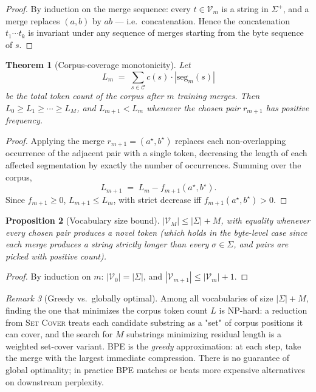\documentclass[11pt]{article}
\newtheorem{theorem}{Theorem}[section]
\newtheorem{proposition}[theorem]{Proposition}
\theoremstyle{remark}
\newtheorem{remark}[theorem]{Remark}
\begin{document}
\begin{proof}
By induction on the merge sequence: every $t \in \mathcal{V}_m$ is a string in $\Sigma^+$, and a merge replaces $(a,b)$ by $ab$ — i.e.\ concatenation. Hence the concatenation $t_1 \cdots t_k$ is invariant under any sequence of merges starting from the byte sequence of $s$. \qedhere
\end{proof}

\begin{theorem}[Corpus-coverage monotonicity]
Let
\[
L_m \;=\; \sum_{s \in \mathcal{C}} c(s) \cdot |\mathrm{seg}_m(s)|
\]
be the total token count of the corpus after $m$ training merges. Then $L_0 \geq L_1 \geq \cdots \geq L_M$, and $L_{m+1} < L_m$ whenever the chosen pair $r_{m+1}$ has positive frequency.
\end{theorem}

\begin{proof}
Applying the merge $r_{m+1} = (a^\star, b^\star)$ replaces each non-overlapping occurrence of the adjacent pair with a single token, decreasing the length of each affected segmentation by exactly the number of occurrences. Summing over the corpus,
\[
L_{m+1} \;=\; L_m - f_{m+1}(a^\star, b^\star).
\]
Since $f_{m+1} \geq 0$, $L_{m+1} \leq L_m$, with strict decrease iff $f_{m+1}(a^\star, b^\star) > 0$. \qedhere
\end{proof}

\begin{proposition}[Vocabulary size bound]
$|\mathcal{V}_M| \leq |\Sigma| + M$, with equality whenever every chosen pair produces a novel token (which holds in the byte-level case since each merge produces a string strictly longer than every $\sigma \in \Sigma$, and pairs are picked with positive count).
\end{proposition}

\begin{proof}
By induction on $m$: $|\mathcal{V}_0| = |\Sigma|$, and $|\mathcal{V}_{m+1}| \leq |\mathcal{V}_m| + 1$. \qedhere
\end{proof}

\begin{remark}[Greedy vs.\ globally optimal]
Among all vocabularies of size $|\Sigma| + M$, finding the one that minimizes the corpus token count $L$ is NP-hard: a reduction from \textsc{Set Cover} treats each candidate substring as a "set" of corpus positions it can cover, and the search for $M$ substrings minimizing residual length is a weighted set-cover variant. BPE is the \emph{greedy} approximation: at each step, take the merge with the largest immediate compression. There is no guarantee of global optimality; in practice BPE matches or beats more expensive alternatives on downstream perplexity.
\end{remark}
\end{document}
